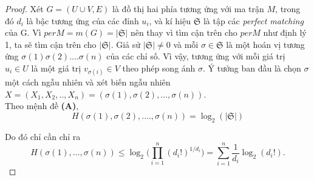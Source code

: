 \documentclass[a4paper, 12pt]{report}
\begin{document}
\begin{proof}
 Xét $G=(U \cup V,E)$ là đồ thị hai phía tương ứng với ma trận $M$, trong đó $d_{i}$ là bậc tương ứng của các đỉnh $u_{i}$, và kí hiệu $\mathfrak{S}$ là tập các \textit{perfect matching} của G. Vì $per M=m(G) = |\mathfrak{S}|$ nên thay vì tìm cận trên cho $per M$ như định lý 1, ta sẽ tìm cận trên cho $|\mathfrak{S}|$. Giả sử $|\mathfrak{S}| \neq 0$ và mỗi $\sigma \in \mathfrak{S}$ là một hoán vị tương ứng $\sigma (1) \sigma (2) ....  \sigma (n)$ của các chỉ số. Vì vậy, tương ứng với mỗi giá trị $u_{i} \in U$ là một giá trị $v_{\sigma(i)} \in V$ theo phép song ánh $\sigma$. Ý tưởng ban đầu là chọn $\sigma$ một cách ngẫu nhiên và xét biến ngẫu nhiên $X=(X_{1},X_{2},..,X_{n}) = (\sigma(1),\sigma(2),...,\sigma(n)).$
\\
Theo mệnh đề \textbf{(A)},
\begin{equation*}
H(\sigma (1), \sigma (2), ....  ,\sigma (n)) = \log_{2}(|\mathfrak{S}|)
\end{equation*}

Do đó chỉ cần chỉ ra
\begin{equation}
    H(\sigma(1),...,\sigma(n)) \leq \log_{2}\Big(\prod_{i=1}^{n}(d_{i}!)^{1/d_{i}}\Big) = \sum_{i=1}^{n}\frac{1}{d_{i}}\log_{2}(d_{i}!).
\end{equation}


\end{proof}
\end{document}

